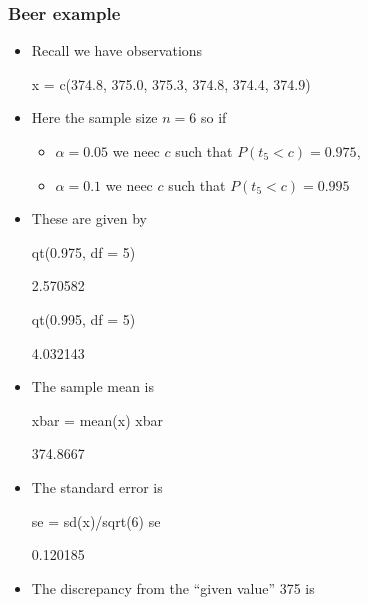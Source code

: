 \documentclass[a4paper]{article}
\begin{document}
\subsubsection{Beer example}
\begin{itemize}
	\item Recall we have observations
\begin{Schunk}
\begin{Sinput}
x = c(374.8, 375.0, 375.3, 374.8, 374.4, 374.9)
\end{Sinput}
\end{Schunk}
	\item Here the sample size \( n = 6 \) so if
	\begin{itemize}
		\item \( \alpha = 0.05 \) we neec \( c \) such that \( P(t_5 < c) = 0.975 \),
		\item \( \alpha = 0.1 \) we neec \( c \) such that \( P(t_5 < c) = 0.995 \) 
	\end{itemize}
	\item These are given by
\begin{Schunk}
\begin{Sinput}
qt(0.975, df = 5)
\end{Sinput}
\begin{Soutput}
[1] 2.570582
\end{Soutput}
\begin{Sinput}
qt(0.995, df = 5)
\end{Sinput}
\begin{Soutput}
[1] 4.032143
\end{Soutput}
\end{Schunk}
	\item The sample mean is
\begin{Schunk}
\begin{Sinput}
xbar = mean(x)
xbar
\end{Sinput}
\begin{Soutput}
[1] 374.8667
\end{Soutput}
\end{Schunk}
	\item The standard error is
\begin{Schunk}
\begin{Sinput}
se = sd(x)/sqrt(6)
se
\end{Sinput}
\begin{Soutput}
[1] 0.120185
\end{Soutput}
\end{Schunk}
	\item The discrepancy from the ``given value'' 375 is

\end{itemize}
\end{document}
